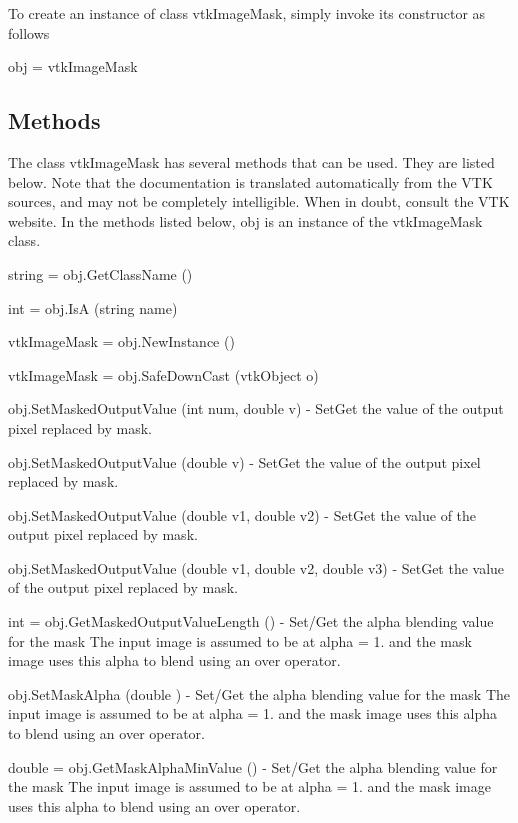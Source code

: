 To create an instance of class vtk\-Image\-Mask, simply invoke its constructor as follows \begin{DoxyVerb}  obj = vtkImageMask
\end{DoxyVerb}
 \hypertarget{vtkwidgets_vtkxyplotwidget_Methods}{}\subsection{Methods}\label{vtkwidgets_vtkxyplotwidget_Methods}
The class vtk\-Image\-Mask has several methods that can be used. They are listed below. Note that the documentation is translated automatically from the V\-T\-K sources, and may not be completely intelligible. When in doubt, consult the V\-T\-K website. In the methods listed below, {\ttfamily obj} is an instance of the vtk\-Image\-Mask class. 
\begin{DoxyItemize}
\item {\ttfamily string = obj.\-Get\-Class\-Name ()}  
\item {\ttfamily int = obj.\-Is\-A (string name)}  
\item {\ttfamily vtk\-Image\-Mask = obj.\-New\-Instance ()}  
\item {\ttfamily vtk\-Image\-Mask = obj.\-Safe\-Down\-Cast (vtk\-Object o)}  
\item {\ttfamily obj.\-Set\-Masked\-Output\-Value (int num, double v)} -\/ Set\-Get the value of the output pixel replaced by mask.  
\item {\ttfamily obj.\-Set\-Masked\-Output\-Value (double v)} -\/ Set\-Get the value of the output pixel replaced by mask.  
\item {\ttfamily obj.\-Set\-Masked\-Output\-Value (double v1, double v2)} -\/ Set\-Get the value of the output pixel replaced by mask.  
\item {\ttfamily obj.\-Set\-Masked\-Output\-Value (double v1, double v2, double v3)} -\/ Set\-Get the value of the output pixel replaced by mask.  
\item {\ttfamily int = obj.\-Get\-Masked\-Output\-Value\-Length ()} -\/ Set/\-Get the alpha blending value for the mask The input image is assumed to be at alpha = 1. and the mask image uses this alpha to blend using an over operator.  
\item {\ttfamily obj.\-Set\-Mask\-Alpha (double )} -\/ Set/\-Get the alpha blending value for the mask The input image is assumed to be at alpha = 1. and the mask image uses this alpha to blend using an over operator.  
\item {\ttfamily double = obj.\-Get\-Mask\-Alpha\-Min\-Value ()} -\/ Set/\-Get the alpha blending value for the mask The input image is assumed to be at alpha = 1. and the mask image uses this alpha to blend using an over operator.  

\end{DoxyItemize}
